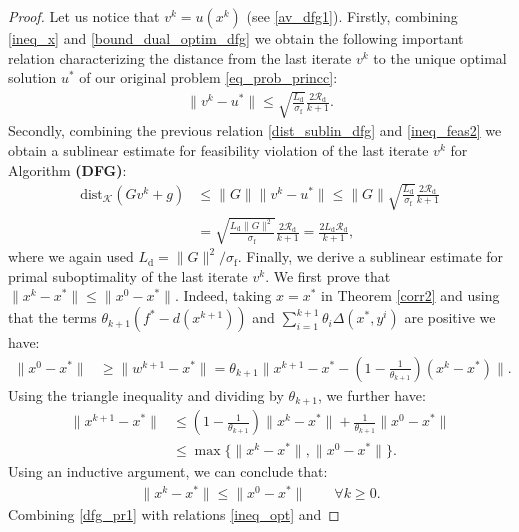 \documentclass{gOMS2e}
\theoremstyle{plain}
\theoremstyle{definition}
\theoremstyle{remark}
\providecommand{\norm}[1]{\lVert#1\rVert}
\begin{document}
\begin{proof} Let us notice that $v^k = u(x^k)$ (see \eqref{av_dfg1}). Firstly,
combining \eqref{ineq_x} and \eqref{bound_dual_optim_dfg} we obtain
the following important relation characterizing the distance from
the last iterate $v^k$ to the unique optimal solution $u^*$ of our
original problem \eqref{eq_prob_princc}:
\begin{align}
\label{dist_sublin_dfg} \| v^k - u^* \| \leq  \sqrt{\frac{
L_\text{d}}{\sigma_\text{f}}} \frac{2 \mathcal{R}_\text{d}}{k+1}.
\end{align}
Secondly, combining the previous relation \eqref{dist_sublin_dfg}
and \eqref{ineq_feas2} we obtain a sublinear estimate for
feasibility violation of the last iterate $v^k$ for Algorithm
\textbf{(DFG)}:
\begin{align}
\label{fes_sublin_f} \text{dist}_{\mathcal{K}}(Gv^k + g)  & \leq
\|G\| \| {}{v}^k - u^* \| \leq  \|G\|
\sqrt{\frac{L_\text{d}}{\sigma_\text{f}}}
 \frac{2\mathcal{R}_\text{d}}{k+1} \nonumber \\
& = \sqrt{\frac{L_\text{d} \|G\|^2}{\sigma_\text{f}}}
\frac{2\mathcal{R}_\text{d}}{k+1}  = \frac{2 L_\text{d}
\mathcal{R}_\text{d}}{k+1},
\end{align}
where we again used $L_\text{d} = \|G\|^2/\sigma_\text{f}$. Finally,
we derive a sublinear estimate for primal suboptimality of the last
iterate $v^k$. We first prove  that $\norm{x^k - x^*} \le
\norm{x^0-x^*}$.  Indeed, taking $x = x^*$ in Theorem \ref{corr2}
and using that  the terms $\theta_{k+1}(f^*-d(x^{k+1}))$ and
$\sum\limits_{i=1}^{k+1}\theta_{i} \Delta(x^*,y^i)$ are positive we
have:
\begin{align*}
\norm{x^0-x^*} & \geq   \norm{w^{k+1}- x^*} =
\theta_{k+1}\norm{x^{k+1} - x^* - \left(1 -
\frac{1}{\theta_{k+1}}\right) (x^k  - x^*) }.
\end{align*}
Using the triangle inequality and dividing by
$\theta_{k+1}$, we further have:
\begin{align*}
\norm{x^{k+1} - x^*} &\le \left(1- \frac{1}{\theta_{k+1}}\right) \norm{x^k - x^*}
+ \frac{1}{\theta_{k+1}}\norm{x^0-x^*} \\
& \le \max \{ \norm{x^k  -x^*}, \norm{x^0 - x^*} \}.
\end{align*}
Using an inductive argument, we can conclude that:
\begin{align}
\label{dfg_pr1} \norm{x^k - x^*} \le \norm{x^0-x^*} \qquad
\forall k \ge 0.
\end{align}
Combining \eqref{dfg_pr1} with relations \eqref{ineq_opt} and

\end{proof}
\end{document}
